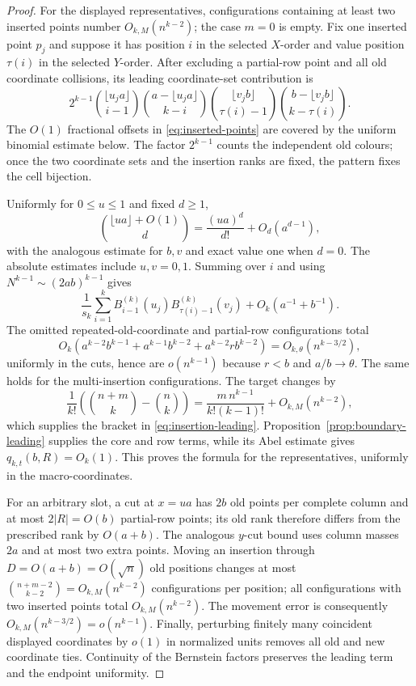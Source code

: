 \begin{proof}
For the displayed representatives, configurations containing at least two
inserted points number $O_{k,M}(n^{k-2})$; the case $m=0$ is empty.  Fix
one inserted point $p_j$ and suppose it has position $i$ in the selected
$X$-order and value position $\tau(i)$ in the selected $Y$-order.  After
excluding a partial-row point and all old coordinate collisions, its leading
coordinate-set contribution is
\[
 2^{k-1}\binom{\lfloor u_ja\rfloor}{i-1}
              \binom{a-\lfloor u_ja\rfloor}{k-i}
              \binom{\lfloor v_jb\rfloor}{\tau(i)-1}
              \binom{b-\lfloor v_jb\rfloor}{k-\tau(i)}.
\]
The $O(1)$ fractional offsets in \eqref{eq:inserted-points} are covered by
the uniform binomial estimate below.  The factor $2^{k-1}$ counts the
independent old colours; once the two coordinate sets and the insertion
ranks are fixed, the pattern fixes the cell bijection.

Uniformly for $0\le u\le1$ and fixed $d\ge1$,
\[
 \binom{\lfloor ua\rfloor+O(1)}d
 =\frac{(ua)^d}{d!}+O_d(a^{d-1}),
\]
with the analogous estimate for $b,v$ and exact value one when $d=0$.
The absolute estimates include $u,v=0,1$.  Summing over $i$ and using
$N^{k-1}\sim(2ab)^{k-1}$ gives
\[
 \frac1{s_k}\sum_{i=1}^k
 B^{(k)}_{i-1}(u_j)B^{(k)}_{\tau(i)-1}(v_j)
 +O_k(a^{-1}+b^{-1}).
\]
The omitted repeated-old-coordinate and partial-row configurations total
\[
 O_k(a^{k-2}b^{k-1}+a^{k-1}b^{k-2}+a^{k-2}rb^{k-2})
 =O_{k,\theta}(n^{k-3/2}),
\]
uniformly in the cuts, hence are $o(n^{k-1})$ because $r<b$ and
$a/b\to\theta$.  The same holds for the multi-insertion configurations.
The target changes by
\[
 \frac1{k!}\left(\binom{n+m}{k}-\binom nk\right)
 =\frac{m\,n^{k-1}}{k!(k-1)!}+O_{k,M}(n^{k-2}),
\]
which supplies the bracket in \eqref{eq:insertion-leading}.  Proposition~\ref{prop:boundary-leading}
supplies the core and row terms, while its Abel estimate gives
$q_{k,t}(b,R)=O_k(1)$.  This proves the formula for the representatives,
uniformly in the macro-coordinates.

For an arbitrary slot, a cut at $x=ua$ has $2b$ old points per complete
column and at most $2|R|=O(b)$ partial-row points; its old rank therefore
differs from the prescribed rank by $O(a+b)$.  The analogous $y$-cut bound
uses column masses $2a$ and at most two extra points.  Moving an insertion
through $D=O(a+b)=O(\sqrt n)$ old positions changes at most
$\binom{n+m-2}{k-2}=O_{k,M}(n^{k-2})$ configurations per position; all
configurations with two inserted points total $O_{k,M}(n^{k-2})$.  The
movement error is consequently
$O_{k,M}(n^{k-3/2})=o(n^{k-1})$.  Finally, perturbing finitely many
coincident displayed coordinates by $o(1)$ in normalized units removes all
old and new coordinate ties.  Continuity of the Bernstein factors preserves
the leading term and the endpoint uniformity.
\end{proof}

